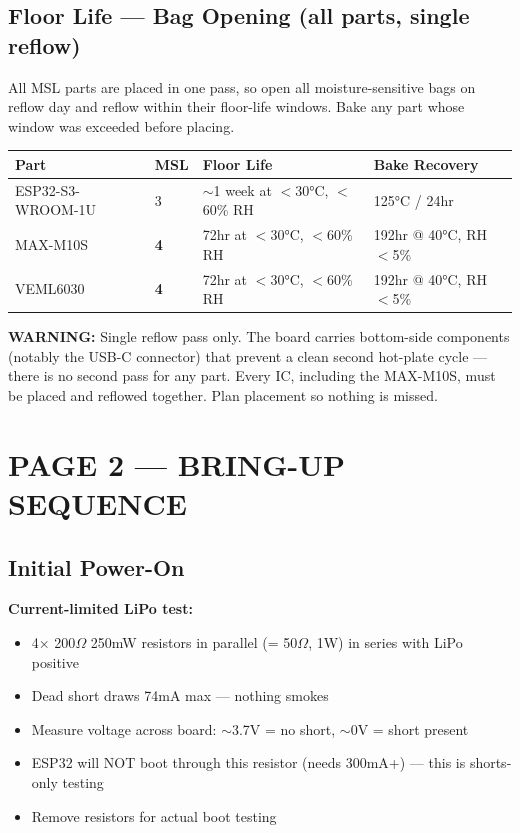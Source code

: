 \documentclass[11pt,a4paper]{article}
\newcommand{\dangerbox}[1]{\par\noindent\colorbox{danger!10}{\parbox{\dimexpr\textwidth-2\fboxsep}{%
\textcolor{danger}{\textbf{WARNING:}} #1}}\par\vspace{0.5em}}
\begin{document}
\subsection*{Floor Life — Bag Opening (all parts, single reflow)}

All MSL parts are placed in one pass, so open all moisture-sensitive bags on reflow day and reflow within their floor-life windows. Bake any part whose window was exceeded before placing.

\begin{table}[H]
\centering
\begin{tabular}{@{}llll@{}}
\toprule
\textbf{Part} & \textbf{MSL} & \textbf{Floor Life} & \textbf{Bake Recovery} \\
\midrule
ESP32-S3-WROOM-1U & 3 & $\sim$1 week at $<$30°C, $<$60\% RH & 125°C / 24hr \\
\rowcolor{danger!10} MAX-M10S & \textbf{4} & 72hr at $<$30°C, $<$60\% RH & 192hr @ 40°C, RH $<$5\% \\
\rowcolor{danger!10} VEML6030 & \textbf{4} & 72hr at $<$30°C, $<$60\% RH & 192hr @ 40°C, RH $<$5\% \\
\bottomrule
\end{tabular}
\end{table}

\dangerbox{Single reflow pass only. The board carries bottom-side components (notably the USB-C connector) that prevent a clean second hot-plate cycle — there is no second pass for any part. Every IC, including the MAX-M10S, must be placed and reflowed together. Plan placement so nothing is missed.}

\newpage
\section*{PAGE 2 — BRING-UP SEQUENCE}

\subsection*{Initial Power-On}

\textbf{Current-limited LiPo test:}
\begin{itemize}[nosep]
\item 4$\times$ 200$\Omega$ 250mW resistors in parallel (= 50$\Omega$, 1W) in series with LiPo positive
\item Dead short draws 74mA max — nothing smokes
\item Measure voltage across board: $\sim$3.7V = no short, $\sim$0V = short present
\item ESP32 will NOT boot through this resistor (needs 300mA+) — this is shorts-only testing
\item Remove resistors for actual boot testing
\end{itemize}
\end{document}
